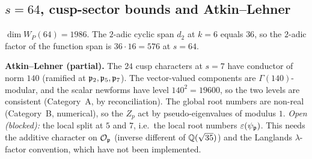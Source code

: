 
\subsection{$s=64$, cusp-sector bounds and Atkin--Lehner}\label{sec:rev5misc}
\begin{proposition}[$s=64$ \src{28}, 15:10 (d) and 15:50 (3)]\label{prop:s64}
$\dim W_P(64)=1986$. The $2$-adic cyclic span $d_2$ at $k=6$ equals $36$, so the $2$-adic factor of the function span is $36\cdot16=576$ at $s=64$.
\end{proposition}
\textbf{Atkin--Lehner (partial).} The $24$ cusp characters at $s=7$ have conductor of norm $140$ (ramified at $\mathfrak{p}_2,\mathfrak{p}_5,\mathfrak{p}_7$). The vector-valued components are $\Gamma(140)$-modular, and the scalar newforms have level
$140^2=19600$, so the two levels are consistent (Category~A, by reconciliation). The global root numbers are non-real (Category~B, numerical), so the $Z_p$ act by pseudo-eigenvalues of modulus $1$. \emph{Open (blocked):} the local split at $5$ and $7$, i.e.\ the local
root numbers $\varepsilon(\psi_{\mathfrak{p}})$. This needs the additive character on $\mathcal{O}_{\mathfrak{p}}$ (inverse different of $\mathbb{Q}(\sqrt{35})$) and the Langlands $\lambda$-factor convention, which have not been implemented.
